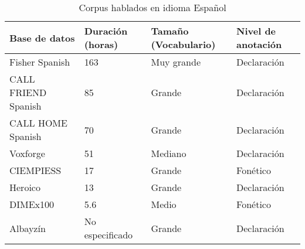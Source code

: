 \begin{table}[H]
\centering
\caption{Corpus hablados en idioma Español}
\label{tab:spanish_corpora}
\begin{tabular}{|l|l|l|l|}
\toprule
\textbf{Base de datos} & \textbf{Duración (horas)} & \textbf{Tamaño (Vocabulario)} & \textbf{Nivel de anotación}\\
\hline
Fisher Spanish \cite{FischerSpa}  & 163 & Muy grande & Declaración\\
\hline
CALL FRIEND Spanish \cite{CALLFRIENDSpa}  & 85 & Grande & Declaración\\
\hline
CALL HOME Spanish \cite{CALLHOMESpa}  & 70 & Grande & Declaración\\
\hline
Voxforge \cite{Voxforge.org}  & 51 & Mediano & Declaración\\
\hline
CIEMPIESS\cite{Hernandez-MenaCIEMPIESS:Corpus}  & 17 & Grande & Fonético\\
\hline
Heroico \cite{HeroicoCorpus}  & 13 & Grande & Declaración  \\
\hline
DIMEx100\cite{Pineda2004DIMEx100:Spanish}  & 5.6 & Medio & Fonético\\
\hline
Albayzín\cite{CampilloAlbayzinEvaluation}  & No especificado  & Grande & Declaración\\
\hline
\end{tabular}
\end{table}